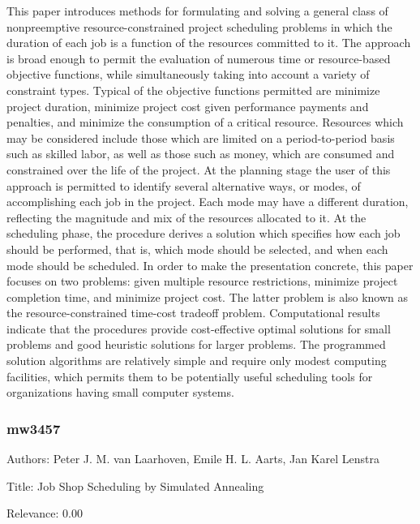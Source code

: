   This paper introduces methods for formulating and solving a general class of nonpreemptive resource-constrained project scheduling problems in which the duration of each job is a function of the resources committed to it. The approach is broad enough to permit the evaluation of numerous time or resource-based objective functions, while simultaneously taking into account a variety of constraint types. Typical of the objective functions permitted are minimize project duration, minimize project cost given performance payments and penalties, and minimize the consumption of a critical resource. Resources which may be considered include those which are limited on a period-to-period basis such as skilled labor, as well as those such as money, which are consumed and constrained over the life of the project. At the planning stage the user of this approach is permitted to identify several alternative ways, or modes, of accomplishing each job in the project. Each mode may have a different duration, reflecting the magnitude and mix of the resources allocated to it. At the scheduling phase, the procedure derives a solution which specifies how each job should be performed, that is, which mode should be selected, and when each mode should be scheduled. In order to make the presentation concrete, this paper focuses on two problems: given multiple resource restrictions, minimize project completion time, and minimize project cost. The latter problem is also known as the resource-constrained time-cost tradeoff problem.    Computational results indicate that the procedures provide cost-effective optimal solutions for small problems and good heuristic solutions for larger problems. The programmed solution algorithms are relatively simple and require only modest computing facilities, which permits them to be potentially useful scheduling tools for organizations having small computer systems.  

\subsubsection{mw3457}
\label{mw:mw3457}

Authors: Peter J. M. van Laarhoven, Emile H. L. Aarts, Jan Karel Lenstra

Title: Job Shop Scheduling by Simulated Annealing

Relevance:  0.00

